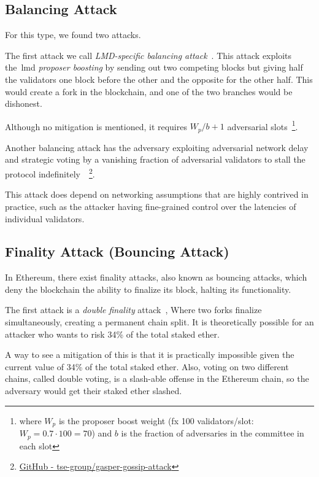 \subsection{Balancing Attack}\label{subsec:balancing-attack}
For this type, we found two attacks.

The first attack we call \textit{LMD-specific balancing attack}~\cite{10.1145/3560829.3563560}.
This attack exploits the~\gls{lmd} \textit{proposer boosting} by sending out two competing blocks but giving half the validators one block before the other and the opposite for the other half.
This would create a fork in the blockchain, and one of the two branches would be dishonest.

Although no mitigation is mentioned, it requires $W_p/b+1$ adversarial slots~\footnote{where $W_p$ is the proposer boost weight (fx 100 validators/slot: $W_p=0.7\cdot100=70$) and $b$ is the fraction of adversaries in the committee in each slot}.


Another balancing attack has the adversary exploiting adversarial network delay and strategic voting by a vanishing fraction of adversarial validators to stall the protocol indefinitely~\cite{10.1007/978-3-031-18283-9_28}~\footnote{\href{https://github.com/tse-group/gasper-gossip-attack}{GitHub - tse-group/gasper-gossip-attack}}.

This attack does depend on networking assumptions that are highly contrived in practice, such as the attacker having fine-grained control over the latencies of individual validators.

\subsection{Finality Attack (Bouncing Attack)}\label{subsec:finality-attack-(bouncing-attack)}
In Ethereum, there exist finality attacks, also known as bouncing attacks, which deny the blockchain the ability to finalize its block, halting its functionality.

The first attack is a \textit{double finality} attack~\cite{EthereumAttackDefense2024, 10646904}, Where two forks finalize simultaneously, creating a permanent chain split.
It is theoretically possible for an attacker who wants to risk 34\% of the total staked ether.

A way to see a mitigation of this is that it is practically impossible given the current value of 34\% of the total staked ether.
Also, voting on two different chains, called double voting, is a slash-able offense in the Ethereum chain, so the adversary would get their staked ether slashed.


